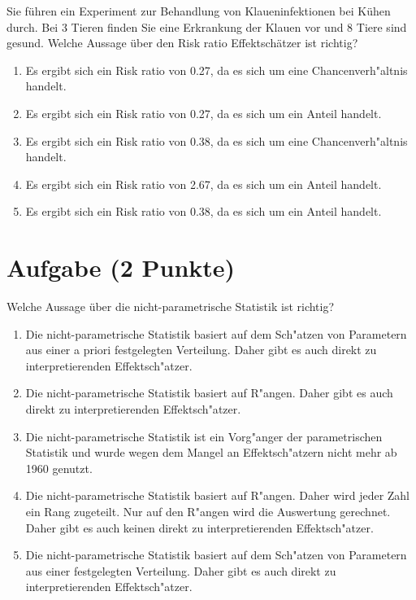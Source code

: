 \documentclass[a4paper, 10pt]{scrartcl}\usepackage[]{graphicx}\usepackage[]{xcolor}
\begin{document}
Sie f{\"u}hren ein Experiment zur Behandlung von Klaueninfektionen bei K{\"u}hen
durch. Bei 3 Tieren finden Sie eine Erkrankung der Klauen vor und
8 Tiere sind gesund. Welche Aussage {\"u}ber den Risk ratio
Effektsch{\"a}tzer ist richtig?



\begin{enumerate}
\item [\textbf{A} \msquare] Es ergibt sich ein Risk ratio von 0.27, da es sich um eine Chancenverh{"a}ltnis handelt.
\item [\textbf{B} \msquare] Es ergibt sich ein Risk ratio von 0.27, da es sich um ein Anteil handelt.
\item [\textbf{C} \msquare] Es ergibt sich ein Risk ratio von 0.38, da es sich um eine Chancenverh{"a}ltnis handelt.
\item [\textbf{D} \msquare] Es ergibt sich ein Risk ratio von 2.67, da es sich um ein Anteil handelt.
\item [\textbf{E} \msquare] Es ergibt sich ein Risk ratio von 0.38, da es sich um ein Anteil handelt.
\end{enumerate}

\section{Aufgabe \hfill (2 Punkte)}




Welche Aussage {\"u}ber die nicht-parametrische Statistik ist richtig?



\begin{enumerate}
\item [\textbf{A} \msquare] Die nicht-parametrische Statistik basiert auf dem Sch{"a}tzen von Parametern aus einer a priori festgelegten Verteilung. Daher gibt es auch direkt zu interpretierenden Effektsch{"a}tzer.
\item [\textbf{B} \msquare] Die nicht-parametrische Statistik basiert auf R{"a}ngen. Daher gibt es auch direkt zu interpretierenden Effektsch{"a}tzer.
\item [\textbf{C} \msquare] Die nicht-parametrische Statistik ist ein Vorg{"a}nger der parametrischen Statistik und wurde wegen dem Mangel an Effektsch{"a}tzern nicht mehr ab 1960 genutzt.
\item [\textbf{D} \msquare] Die nicht-parametrische Statistik basiert auf R{"a}ngen. Daher wird jeder Zahl ein Rang zugeteilt. Nur auf den R{"a}ngen wird die Auswertung gerechnet. Daher gibt es auch keinen direkt zu interpretierenden Effektsch{"a}tzer.
\item [\textbf{E} \msquare] Die nicht-parametrische Statistik basiert auf dem Sch{"a}tzen von Parametern aus einer festgelegten Verteilung. Daher gibt es auch direkt zu interpretierenden Effektsch{"a}tzer.
\end{enumerate}
\end{document}
